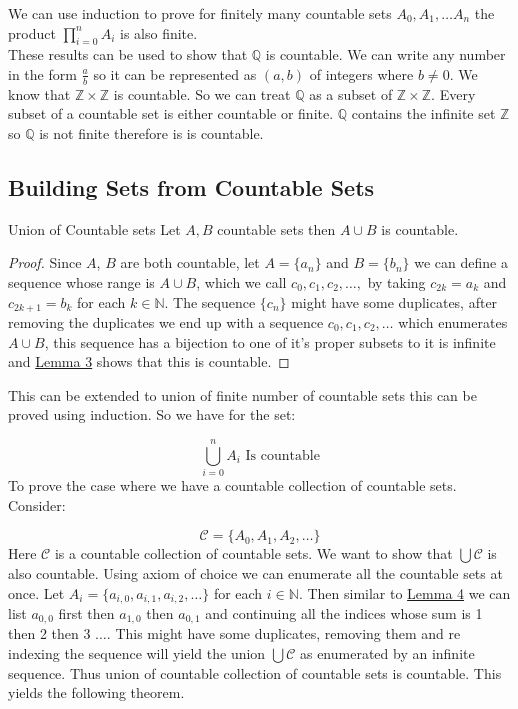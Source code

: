 \documentclass[16pt,a4paper]{article}
\theoremstyle{definition}
\begin{document}
We can use induction to prove for finitely many countable sets $A_0, A_1, \ldots A_n$ the product $\prod\limits_{i=0}^nA_i$ is also finite. \\

These results can be used to show that $\mathbb{Q}$ is countable. We can write any number in the form $\frac{a}{b}$ so it can be represented as $(a,b)$ of integers where $b\neq 0$. We know that $\mathbb{Z\times Z}$ is countable. So we can treat $\mathbb{Q}$ as a subset of $\mathbb{Z\times Z}$. Every subset of a countable set is either countable or finite. $\mathbb{Q}$ contains the infinite set $\mathbb{Z}$ so $\mathbb{Q}$ is not finite therefore is is countable.  


\newpage	

\subsection{Building Sets from Countable Sets}
\begin{lemm}{Union of Countable sets}{}
Let $A, B$ countable sets then $A\cup B$ is countable. 
\end{lemm}
\begin{proof}
Since $A$, $B$ are both countable, let $A = \{a_n\}$ and $B = \{b_n\}$ we can define a sequence whose range is $A\cup B$, which we call $c_0, c_1, c_2, \ldots, $ by taking $c_{2k} = a_{k}$ and $c_{2k+1} = b_k$ for each $k\in \mathbb{N}$. The sequence $\{c_n\}$ might have some duplicates, after removing the duplicates we end up with a sequence $c_0, c_1, c_2, \ldots$ which enumerates $A\cup B$, this sequence has a bijection to one of it's proper subsets to it is infinite and \hyperref[lem3]{Lemma 3} shows that this is countable. 
\end{proof}

This can be extended to union of finite number of countable sets this can be proved using induction. So we have for the set: 

\[\bigcup_{i = 0}^n A_i \text{ Is countable}\]
To prove the case where we have a countable collection of countable sets. Consider: 

\[\mathcal{C} = \{A_0, A_1, A_2, \ldots\}\]
Here $\mathcal{C}$ is a countable collection of countable sets. We want to show that $\bigcup \mathcal{C}$ is also countable. Using axiom of choice we can enumerate all the countable sets at once. Let $A_i = \{a_{i,0}, a_{i,1}, a_{i,2}, \ldots\}$ for each $i \in \mathbb{N}$. Then similar to \hyperref[lem4]{Lemma 4} we can list $a_{0,0}$ first then $a_{1,0}$ then $a_{0,1}$ and continuing all the indices whose sum is 1 then 2 then 3 $\ldots$. This might have some duplicates, removing them and re indexing the sequence will yield the  union $\bigcup \mathcal{C}$ as enumerated by an infinite sequence. Thus union of countable collection of countable sets is countable. This yields the following theorem.  
\end{document}
